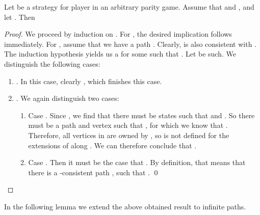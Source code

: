 \documentclass[a4paper]{llncs}
\begin{document}
\begin{lemma}
\label{lem:strategy_for_stut}
Let  be a strategy for player  in an arbitrary parity game. Assume that  and , and let . Then

\end{lemma}
\begin{proof}
  We proceed by induction on . For , the desired implication follows 
  immediately. For , assume that we have a path  . 
  Clearly,  is also consistent with . The induction hypothesis yields us a  for some  such that . Let 
  be such. We distinguish the following cases:
  \begin{enumerate}
    \item . In this case, clearly , which finishes this
    case.
    
    \item . We again distinguish two cases:
    \begin{enumerate}
      \item Case . Since
      , we find that there must be states  such that
       and . So there must be a path
       and vertex  such that , for which
      we know that . Therefore, all vertices in  are owned by
      , so  is not defined for the extensions of 
       along . We can therefore conclude that .

      \item Case . Then it must be the case that
      . By definition, that 
      means that there is a -consistent path , such that . \qed
    \end{enumerate}
  \end{enumerate} 
\end{proof}
In the following
lemma we extend the above obtained result to infinite paths.
\end{document}
